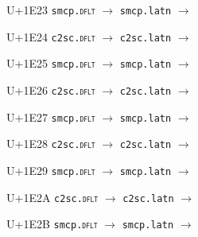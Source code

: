\documentclass{article}
\begin{document}
\begin{substitutions}
\goodbreak

U+1E23  \linebreak
    \texttt{smcp.\textsc{dflt}} $\to$  \linebreak
    \texttt{smcp.latn} $\to$  

\goodbreak

U+1E24  \linebreak
    \texttt{c2sc.\textsc{dflt}} $\to$  \linebreak
    \texttt{c2sc.latn} $\to$  

\goodbreak

U+1E25  \linebreak
    \texttt{smcp.\textsc{dflt}} $\to$  \linebreak
    \texttt{smcp.latn} $\to$  

\goodbreak

U+1E26  \linebreak
    \texttt{c2sc.\textsc{dflt}} $\to$  \linebreak
    \texttt{c2sc.latn} $\to$  

\goodbreak

U+1E27  \linebreak
    \texttt{smcp.\textsc{dflt}} $\to$  \linebreak
    \texttt{smcp.latn} $\to$  

\goodbreak

U+1E28  \linebreak
    \texttt{c2sc.\textsc{dflt}} $\to$  \linebreak
    \texttt{c2sc.latn} $\to$  

\goodbreak

U+1E29  \linebreak
    \texttt{smcp.\textsc{dflt}} $\to$  \linebreak
    \texttt{smcp.latn} $\to$  

\goodbreak

U+1E2A  \linebreak
    \texttt{c2sc.\textsc{dflt}} $\to$  \linebreak
    \texttt{c2sc.latn} $\to$  

\goodbreak

U+1E2B  \linebreak
    \texttt{smcp.\textsc{dflt}} $\to$  \linebreak
    \texttt{smcp.latn} $\to$  


\end{substitutions}
\end{document}
